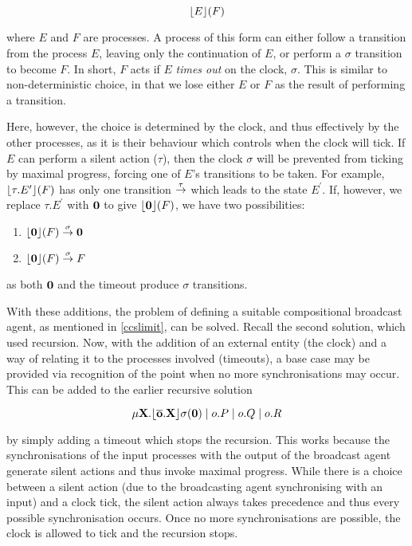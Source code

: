 \begin{equation}
\lfloor{E}\rfloor({F})
\end{equation}

\noindent where $E$ and $F$ are processes.  A process of this form can
either follow a transition from the process $E$, leaving only the
continuation of $E$, or perform a $\sigma$ transition to become $F$.
In short, $F$ acts if $E$ \emph{times out} on the clock, $\sigma$.
This is similar to non-deterministic choice, in that we lose either
$E$ or $F$ as the result of performing a transition.

Here, however, the choice is determined by the clock, and thus
effectively by the other processes, as it is their behaviour which
controls when the clock will tick.  If $E$ can perform a silent action
($\tau$), then the clock $\sigma$ will be prevented from ticking by
maximal progress, forcing one of $E$'s transitions to be taken.  For
example, $\lfloor{\tau.E^\prime}\rfloor({F})$ has only one transition
$\stackrel{\tau}{\rightarrow}$ which leads to the state $E^\prime$.  If, however, we
replace $\tau.E^\prime$ with $\textbf{0}$ to give
$\lfloor{\textbf{0}}\rfloor({F})$, we have two possibilities:

\begin{enumerate}
\item $\lfloor{\textbf{0}}\rfloor({F}) \stackrel{\sigma}{\rightarrow} \textbf{0}$
\item $\lfloor{\textbf{0}}\rfloor({F}) \stackrel{\sigma}{\rightarrow} F$
\end{enumerate}

\noindent as both $\textbf{0}$ and the timeout produce $\sigma$ transitions.

With these additions, the problem of defining a suitable compositional
broadcast agent, as mentioned in \ref{ccslimit}, can be solved.
Recall the second solution, which used recursion.  Now, with the
addition of an external entity (the clock) and a way of relating it to
the processes involved (timeouts), a base case may be provided via
recognition of the point when no more synchronisations may occur.
This can be added to the earlier recursive solution

\begin{equation}
\mathbf{\mu X.\lfloor{\overline{o}.X}\rfloor {\sigma} ({0})} \;|\; o.P \;|\; o.Q \;|\; o.R
\end{equation}

\noindent by simply adding a timeout which stops the recursion.  This
works because the synchronisations of the input processes with the
output of the broadcast agent generate silent actions and thus invoke
maximal progress.  While there is a choice between a silent action
(due to the broadcasting agent synchronising with an input) and a
clock tick, the silent action always takes precedence and thus every
possible synchronisation occurs.  Once no more synchronisations are
possible, the clock is allowed to tick and the recursion stops.


